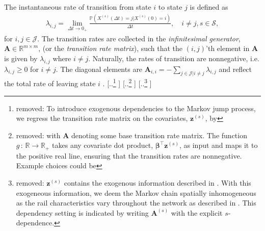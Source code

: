 \documentclass{article}
\providecommand{\DIFdel}[1]{{\protect\color{red} [..\footnote{removed: #1} ]}} %
\providecommand{\DIFdelbegin}{} %
\providecommand{\DIFdelend}{} %
\begin{document}
The instantaneous rate of transition from state $i$ to state $j$ is defined as
\begin{align*}
    \lambda_{i,j} = 
    \lim_{\Delta t \rightarrow 0_+} \frac{ \mathds{P}\left( X^{(s)}(\Delta t) = j | X^{(s)}(0) = i\right)}{\Delta t}, \quad i \neq j, s \in \mathcal S,
\end{align*}
for $i,j \in \mathcal{J}$. The transition rates are collected in the \textit{infinitesimal generator}, $\bm{A} \in \mathbb R^{m \times m}$, (or the \textit{transition rate matrix}), such that the $(i,j)$'th element in $\bm{A}$ is given by $\lambda_{i,j}$ where $i \neq j$. Naturally, the rates of transition are nonnegative, i.e. $\lambda_{i,j} \geq 0$ for $i \neq j$. The diagonal elements are $\bm{A}_{i,i} = -\sum_{j \in \mathcal{J} | i \neq j } \lambda_{i,j}$ and reflect the total rate of leaving state $i$ \citep[Section 1.3]{bladt_nielsen}. 
\DIFdelbegin \DIFdel{To introduce exogenous dependencies to the Markov jump process, we regress the transition rate matrix on the covariates, $\bm{z}^{(s)}$, by
}%
\DIFdel{with $\bm{A}$ denoting some base transition rate matrix. The function $g \, : \, \mathbb{R} \rightarrow \mathbb{R_+}$ takes any covariate dot product, $\bm{\beta}^\top \bm{z}^{(s)}$, as input and maps it to the positive real line, ensuring that the transition rates are nonnegative. Example choices could be
}%
\DIFdel{$\bm{z}^{(s)}$ contains the exogenous information described in \Cref{sec:data}. With this exogeneous information, we deem the Markov chain spatially inhomogeneous as the rail characteristics vary throughout the network as described in \Cref{sec:data}. This dependency setting is indicated by writing $\bm{A}^{(s)}$ with the explicit $s$-dependence.
}\DIFdelend 
\end{document}
